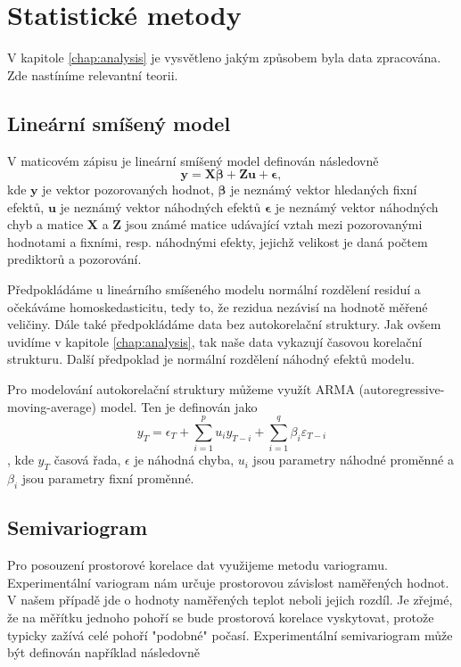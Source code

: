 \section{Statistické metody}\label{chap:statistika}
V kapitole \ref{chap:analysis} je vysvětleno jakým způsobem byla data zpracována. Zde nastíníme relevantní teorii.

\subsection{Lineární smíšený model}\label{chap:lme}
V maticovém zápisu je lineární smíšený model definován následovně\cite{mcleanrobert1991}
$$\boldsymbol{y} = \boldsymbol{X}\boldsymbol{\beta} + \boldsymbol{Z}\boldsymbol{u} + \boldsymbol{\epsilon},$$ \label{eq:linearmixedeffectmodel}
kde $\mathbf{y}$ je vektor pozorovaných hodnot, $\mathbf{\beta}$ je neznámý vektor hledaných fixní efektů, $\mathbf{u}$ je neznámý vektor náhodných efektů $\mathbf{\epsilon}$ je neznámý vektor náhodných chyb a matice $\mathbf{X}$ a $\mathbf{Z}$ jsou známé matice udávající vztah mezi pozorovanými hodnotami a fixními, resp. náhodnými efekty, jejichž velikost je daná počtem prediktorů a pozorování\cite{mcleanrobert1991}.

Předpokládáme u lineárního smíšeného modelu normální rozdělení residuí a očekáváme homoskedasticitu, tedy to, že rezidua nezávisí na hodnotě měřené veličiny. Dále také předpokládáme data bez autokorelační struktury. Jak ovšem uvidíme v kapitole \ref{chap:analysis}, tak naše data vykazují časovou korelační strukturu. Další předpoklad je normální rozdělení náhodný efektů modelu\cite{hefleytrevorj2017}. 

Pro modelování autokorelační struktury můžeme využít ARMA (autoregressive-moving-average) model. Ten je definován jako\cite{wilsongranville2016}
$$y_T = \epsilon_T + \sum_{i=1}^{p}u_i y_{T-i} + \sum_{i=1}^{q}\beta_i\varepsilon_{T-i}$$,
kde $y_T$ časová řada, $\epsilon$ je náhodná chyba, $u_i$ jsou parametry náhodné proměnné a $\beta_i$ jsou parametry fixní proměnné. 

\subsection{Semivariogram}\label{chap:variogram}
Pro posouzení prostorové korelace dat využijeme metodu variogramu. Experimentální variogram nám určuje prostorovou závislost naměřených hodnot. V našem případě jde o hodnoty naměřených teplot neboli jejich rozdíl. Je zřejmé, že na měřítku jednoho pohoří se bude prostorová korelace vyskytovat, protože typicky zažívá celé pohoří "podobné" počasí. Experimentální semivariogram může být definován například následovně


